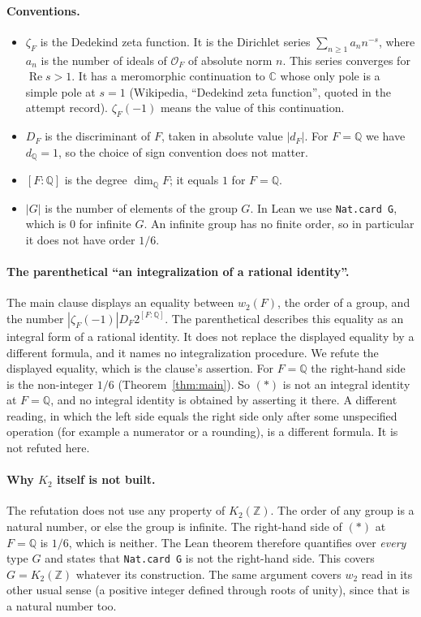\documentclass[11pt]{article}
\theoremstyle{remark}
\newcommand{\Q}{\mathbb{Q}}
\newcommand{\Z}{\mathbb{Z}}
\newcommand{\C}{\mathbb{C}}
\newcommand{\OO}{\mathcal{O}}
\begin{document}
\paragraph{Conventions.}
\begin{itemize}
\item $\zeta_F$ is the Dedekind zeta function. It is the Dirichlet series
  $\sum_{n\ge 1} a_n n^{-s}$, where $a_n$ is the number of ideals of $\OO_F$ of absolute norm $n$.
  This series converges for $\operatorname{Re} s>1$. It has a meromorphic continuation to $\C$
  whose only pole is a simple pole at $s=1$ (Wikipedia, ``Dedekind zeta function'', quoted in the
  attempt record). $\zeta_F(-1)$ means the value of this continuation.
\item $D_F$ is the discriminant of $F$, taken in absolute value $|d_F|$. For $F=\Q$ we have
  $d_\Q = 1$, so the choice of sign convention does not matter.
\item $[F:\Q]$ is the degree $\dim_\Q F$; it equals $1$ for $F=\Q$.
\item $|G|$ is the number of elements of the group $G$. In Lean we use \texttt{Nat.card G}, which is
  $0$ for infinite $G$. An infinite group has no finite order, so in particular it does not have
  order $1/6$.
\end{itemize}

\paragraph{The parenthetical ``an integralization of a rational identity''.}
The main clause displays an equality between $w_2(F)$, the order of a group, and the number
$|\zeta_F(-1)|D_F2^{[F:\Q]}$. The parenthetical describes this equality as an integral form of a
rational identity. It does not replace the displayed equality by a different formula, and it names
no integralization procedure. We refute the displayed equality, which is the clause's assertion.
For $F=\Q$ the right-hand side is the non-integer $1/6$ (Theorem~\ref{thm:main}). So $(\ast)$ is not
an integral identity at $F=\Q$, and no integral identity is obtained by asserting it there. A
different reading, in which the left side equals the right side only after some unspecified
operation (for example a numerator or a rounding), is a different formula. It is not refuted here.

\paragraph{Why $K_2$ itself is not built.}
The refutation does not use any property of $K_2(\Z)$. The order of any group is a natural number,
or else the group is infinite. The right-hand side of $(\ast)$ at $F=\Q$ is $1/6$, which is neither.
The Lean theorem therefore quantifies over \emph{every} type $G$ and states that \texttt{Nat.card G}
is not the right-hand side. This covers $G=K_2(\Z)$ whatever its construction. The same argument
covers $w_2$ read in its other usual sense (a positive integer defined through roots of unity), since
that is a natural number too.
\end{document}
